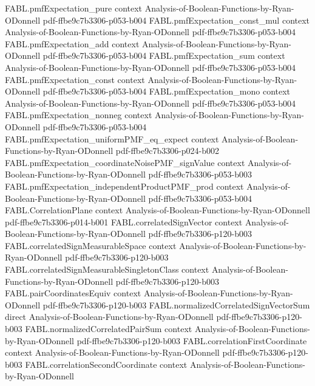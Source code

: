 \begin{theorem}
\proofstep
  {FABL.pmfExpectation_pure}
  {context}
  {Analysis-of-Boolean-Functions-by-Ryan-ODonnell}
  {pdf-ffbe9c7b3306-p053-b004}
\proofstep
  {FABL.pmfExpectation_const_mul}
  {context}
  {Analysis-of-Boolean-Functions-by-Ryan-ODonnell}
  {pdf-ffbe9c7b3306-p053-b004}
\proofstep
  {FABL.pmfExpectation_add}
  {context}
  {Analysis-of-Boolean-Functions-by-Ryan-ODonnell}
  {pdf-ffbe9c7b3306-p053-b004}
\proofstep
  {FABL.pmfExpectation_sum}
  {context}
  {Analysis-of-Boolean-Functions-by-Ryan-ODonnell}
  {pdf-ffbe9c7b3306-p053-b004}
\proofstep
  {FABL.pmfExpectation_const}
  {context}
  {Analysis-of-Boolean-Functions-by-Ryan-ODonnell}
  {pdf-ffbe9c7b3306-p053-b004}
\proofstep
  {FABL.pmfExpectation_mono}
  {context}
  {Analysis-of-Boolean-Functions-by-Ryan-ODonnell}
  {pdf-ffbe9c7b3306-p053-b004}
\proofstep
  {FABL.pmfExpectation_nonneg}
  {context}
  {Analysis-of-Boolean-Functions-by-Ryan-ODonnell}
  {pdf-ffbe9c7b3306-p053-b004}
\proofstep
  {FABL.pmfExpectation_uniformPMF_eq_expect}
  {context}
  {Analysis-of-Boolean-Functions-by-Ryan-ODonnell}
  {pdf-ffbe9c7b3306-p024-b002}
\proofstep
  {FABL.pmfExpectation_coordinateNoisePMF_signValue}
  {context}
  {Analysis-of-Boolean-Functions-by-Ryan-ODonnell}
  {pdf-ffbe9c7b3306-p053-b003}
\proofstep
  {FABL.pmfExpectation_independentProductPMF_prod}
  {context}
  {Analysis-of-Boolean-Functions-by-Ryan-ODonnell}
  {pdf-ffbe9c7b3306-p053-b004}
\proofstep
  {FABL.CorrelationPlane}
  {context}
  {Analysis-of-Boolean-Functions-by-Ryan-ODonnell}
  {pdf-ffbe9c7b3306-p014-b001}
\proofstep
  {FABL.correlatedSignVector}
  {context}
  {Analysis-of-Boolean-Functions-by-Ryan-ODonnell}
  {pdf-ffbe9c7b3306-p120-b003}
\proofstep
  {FABL.correlatedSignMeasurableSpace}
  {context}
  {Analysis-of-Boolean-Functions-by-Ryan-ODonnell}
  {pdf-ffbe9c7b3306-p120-b003}
\proofstep
  {FABL.correlatedSignMeasurableSingletonClass}
  {context}
  {Analysis-of-Boolean-Functions-by-Ryan-ODonnell}
  {pdf-ffbe9c7b3306-p120-b003}
\proofstep
  {FABL.pairCoordinatesEquiv}
  {context}
  {Analysis-of-Boolean-Functions-by-Ryan-ODonnell}
  {pdf-ffbe9c7b3306-p120-b003}
\proofstep
  {FABL.normalizedCorrelatedSignVectorSum}
  {direct}
  {Analysis-of-Boolean-Functions-by-Ryan-ODonnell}
  {pdf-ffbe9c7b3306-p120-b003}
\proofstep
  {FABL.normalizedCorrelatedPairSum}
  {context}
  {Analysis-of-Boolean-Functions-by-Ryan-ODonnell}
  {pdf-ffbe9c7b3306-p120-b003}
\proofstep
  {FABL.correlationFirstCoordinate}
  {context}
  {Analysis-of-Boolean-Functions-by-Ryan-ODonnell}
  {pdf-ffbe9c7b3306-p120-b003}
\proofstep
  {FABL.correlationSecondCoordinate}
  {context}
  {Analysis-of-Boolean-Functions-by-Ryan-ODonnell}

\end{theorem}
